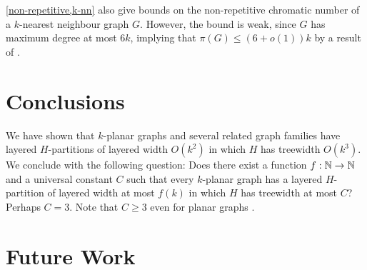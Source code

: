 \documentclass{patmorin}
\renewcommand{\geq}{\geqslant}
\renewcommand{\leq}{\leqslant}
\begin{document}
\cref{non-repetitive,k-nn} also give bounds on the non-repetitive chromatic number of a $k$-nearest neighbour graph $G$. However, the bound is weak, since $G$ has maximum degree at most $6k$, implying that $\pi(G) \leq (6+o(1))k$ by a result of \citet{DJKW16}.


\section{Conclusions}

We have shown that $k$-planar graphs and several related graph families have layered $H$-partitions of layered width $O(k^2)$ in which $H$ has treewidth $O(k^3)$.  We conclude with the following question:  Does there exist a function $f:\mathbb{N}\to\mathbb{N}$ and a universal constant $C$ such that every $k$-planar graph has a layered $H$-partition of layered width at most $f(k)$ in which $H$ has treewidth at most $C$?  Perhaps $C=3$. Note that $C\geq 3$ even for planar graphs \citep{dujmovic.joret.ea:planar}.  



\newpage
\appendix

\section{Future Work}
\end{document}
